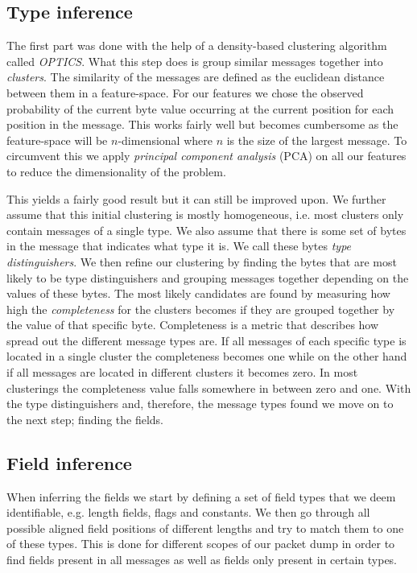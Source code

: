 \documentclass[a4paper,twocolumn]{article}
\begin{document}
\subsection{Type inference}
The first part was done with the help of a density-based clustering algorithm
called \emph{OPTICS}. What this step does is group similar messages together into
\emph{clusters}. The similarity of the messages are defined as the euclidean
distance between them in a feature-space. For our features we chose the
observed probability of the current byte value occurring at the current
position for each position in the message. This works fairly well but becomes
cumbersome as the feature-space will be $n$-dimensional where $n$ is the size
of the largest message. To circumvent this we apply
\emph{principal component analysis} (PCA) on all our features to reduce the
dimensionality of the problem.

This yields a fairly good result but it can still be improved upon. We further
assume that this initial clustering is mostly homogeneous, i.e. most clusters
only contain messages of a single type. We also assume that there is some set
of bytes in the message that indicates what type it is. We call these bytes
\emph{type distinguishers}. We then refine our clustering by finding the bytes
that are most likely to be type distinguishers and grouping messages together
depending on the values of these bytes. The most likely candidates are found by
measuring how high the \emph{completeness} for the clusters becomes if they are
grouped together by the value of that specific byte. Completeness is a metric
that describes how spread out the different message types are. If all messages
of each specific type is located in a single cluster the completeness becomes
one while on the other hand if all messages are located in different clusters
it becomes zero. In most clusterings the completeness value falls somewhere
in between zero and one. With the type distinguishers and, therefore, the
message types found we move on to the next step; finding the fields.

\subsection{Field inference}
When inferring the fields we start by defining a set of field types that we
deem identifiable, e.g. length fields, flags and constants. We then go through
all possible aligned field positions of different lengths and try to match them
to one of these types. This is done for different scopes of our packet dump in
order to find fields present in all messages as well as fields only present in
certain types.
\end{document}
